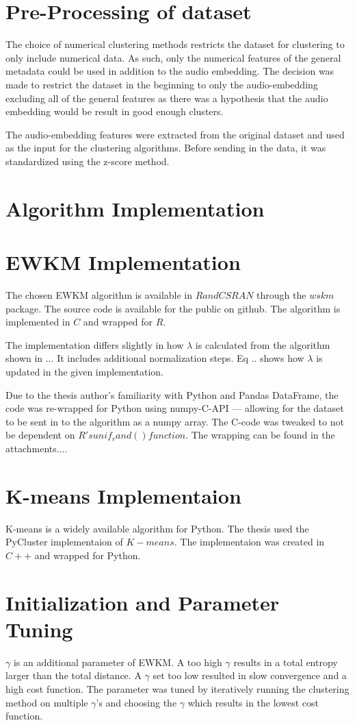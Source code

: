 \documentclass[../report.tex]{subfiles}
\begin{document}
\section{Pre-Processing of dataset}
The choice of numerical clustering methods restricts the dataset for clustering to only include numerical data. As such, only the numerical features of the general metadata could be used in addition to the audio embedding. The decision was made to restrict the dataset in the beginning to only the audio-embedding excluding all of the general features as there was a hypothesis that the audio embedding would be result in good enough clusters.

The audio-embedding features were extracted from the original dataset and used as the input for the clustering algorithms. Before sending in the data, it was standardized using the z-score method.

\section{Algorithm Implementation}
\section{EWKM Implementation}
The chosen EWKM algorithm is available in $R and CSRAN$ through the $wskm$ package. The source code is available for the public on github. The algorithm is implemented in $C$ and wrapped for $R$.

The implementation differs slightly in how $\lambda$ is calculated from the algorithm shown in ... It includes additional normalization steps. Eq .. shows how $\lambda$ is updated in the given implementation. 


Due to the thesis author's familiarity with Python and Pandas DataFrame, the code was re-wrapped for Python using numpy-C-API --- allowing for the dataset to be sent in to the algorithm as a numpy array. The C-code was tweaked to not be dependent on $R's unif_rand() function$. The wrapping can be found in the attachments....

\section{K-means Implementaion}
K-means is a widely available algorithm for Python. The thesis used the PyCluster implementaion of $K-means$. The implementaion was created in $C++$ and wrapped for Python.

\section{Initialization and Parameter Tuning}


$\gamma$ is an additional parameter of EWKM. A too high $\gamma$ results in a total entropy larger than the total distance. A $\gamma$ set too low resulted in slow convergence and a high cost function. The parameter was tuned by iteratively running the clustering method on multiple $\gamma$'s and choosing the $\gamma$ which results in the lowest cost function.
\end{document}
